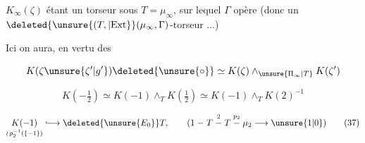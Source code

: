 $K_\infty(\zeta)$ étant un torseur sous $T=\mu_\infty$, sur lequel $\Gamma$ opère (donc un $\deleted{\unsure{(T,|\mathrm{Ext}}}(\mu_\infty,\Gamma)$-torseur ...)

Ici on aura, en vertu des 

\[
K(\zeta\unsure{\zeta'|g'} )\deleted{\unsure{\circ}}\simeq K(\zeta)\wedge_{\unsure{\Pi_\infty|T}}K(\zeta')
\]

\[
K(-\tfrac12)\simeq K(-1)\wedge_T K(\tfrac12)\simeq K(-1)\wedge_T K(2)^{-1}
\tag*{(36)}
\]

\[
\underset{\wr\,p_2^{-1}(\{-1\})}{K(-1)}\lhook\joinrel\longrightarrow\deleted{\unsure{E_0}}T,\qquad
(1\mathrel{-}T\mathrel{\overset{2}{-}}T\mathrel{\overset{p_2}{-}}\mu_2\longrightarrow\unsure{1|0})
\tag*{(37)}
\]

